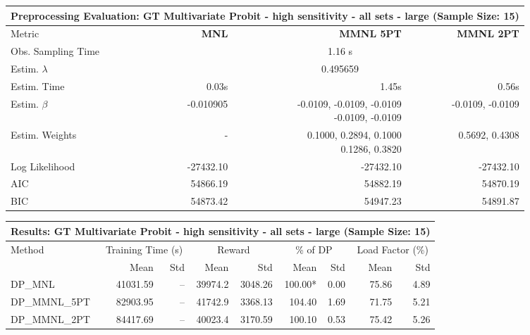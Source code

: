 
\begin{samepage}
\begin{center}
  \small
  \begin{tabular}{l|r|r|r}
    \toprule
    \multicolumn{4}{c}{\textbf{Preprocessing Evaluation: GT Multivariate Probit - high sensitivity - all sets - large (Sample Size: 15)}} \\
    \midrule
    Metric & \textbf{MNL} & \textbf{MMNL 5PT} & \textbf{MMNL 2PT} \\
    \midrule
    Obs. Sampling Time & \multicolumn{3}{c}{1.16 s} \\
    Estim. $\lambda$ & \multicolumn{3}{c}{0.495659} \\
    Estim. Time & 0.03s & 1.45s & 0.56s \\
    Estim. $\beta$ & -0.010905 & \makecell[tr]{-0.0109, -0.0109, -0.0109 \\ -0.0109, -0.0109} & -0.0109, -0.0109 \\
    Estim. Weights & - & \makecell[tr]{0.1000, 0.2894, 0.1000 \\ 0.1286, 0.3820} & 0.5692, 0.4308 \\
    Log Likelihood & -27432.10 & -27432.10 & -27432.10 \\
    AIC & 54866.19 & 54882.19 & 54870.19 \\
    BIC & 54873.42 & 54947.23 & 54891.87 \\
    \bottomrule
  \end{tabular}
\end{center}
\begin{center}
  \small
  \begin{tabular}{l|rr|rr|rr|rr}
    \toprule
    \multicolumn{9}{c}{\textbf{Results: GT Multivariate Probit - high sensitivity - all sets - large (Sample Size: 15)}} \\
    \midrule
    Method & \multicolumn{2}{c|}{Training Time (s)} & \multicolumn{2}{c|}{Reward} & \multicolumn{2}{c|}{\% of DP} & \multicolumn{2}{c}{Load Factor (\%)} \\
    & Mean & Std & Mean & Std & Mean & Std & Mean & Std \\
    \midrule
    DP\_MNL      & 41031.59 &    -- &    39974.2 &    3048.26 & 100.00* &    0.00 &   75.86 &    4.89 \\
    DP\_MMNL\_5PT & 82903.95 &    -- &    41742.9 &    3368.13 &  104.40 &    1.69 &   71.75 &    5.21 \\
    DP\_MMNL\_2PT & 84417.69 &    -- &    40023.4 &    3170.59 &  100.10 &    0.53 &   75.42 &    5.26 \\

\end{tabular}
\end{center}
\end{samepage}
